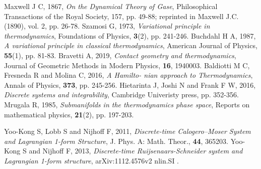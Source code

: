 \documentclass[12pt]{article}
\numberwithin{equation}{section}
\theoremstyle{remark}
\theoremstyle{definition}
\begin{document}
\begin{thebibliography}{}
%
%
Maxwell J C, 1867, 
\emph{On the Dynamical Theory of Gase}, Philosophical Transactions of the Royal Society, 157, pp. 49-88; reprinted in Maxwell J.C. (1890), vol. 2, pp. 26-78.
%
%
Szamosi G, 1973, 
\emph{Variational principle in thermodynamics}, Foundations of Physics, \textbf{3}(2), pp. 241-246.
%
%
Buchdahl H A, 1987, 
\emph{A variational principle in classical thermodynamics}, American Journal of Physics, \textbf{55}(1), pp. 81-83.
%
Bravetti A, 2019, 
\emph{Contact geometry and thermodynamics}, Journal of Geometric Methods in Modern Physics, \textbf{16}, 1940003.
%
%
Baldiotti M C, Fresneda R and Molina C, 2016, 
\emph{A Hamilto- nian approach to Thermodynamics}, Annals of Physics, \textbf{373}, pp. 245-256.
%
%
Hietarinta J, Joshi  N and Frank F W, 2016, 
\emph{Discrete systems and integrability}, Cambridge Univeristy press, pp. 352-356.
%
Mrugala R, 1985, 
\emph{Submanifolds in the thermodynamics phase space}, 
Reports on mathematical physics, \textbf{21}(2), pp. 197-203.
%

Yoo-Kong S, Lobb S and Nijhoff F, 2011, 
\emph{Discrete-time Calogero–Moser System and Lagrangian 1-form Structure}, 
J. Phys. A: Math. Theor., \textbf{44}, 365203.
%
Yoo-Kong S and Nijhoff F, 2013, 
\emph{Discrete-time Ruijsenaars-Schneider system and Lagrangian 1-form structure}, 
arXiv:1112.4576v2 nlin.SI .
%






\end{thebibliography} 
\end{document}
